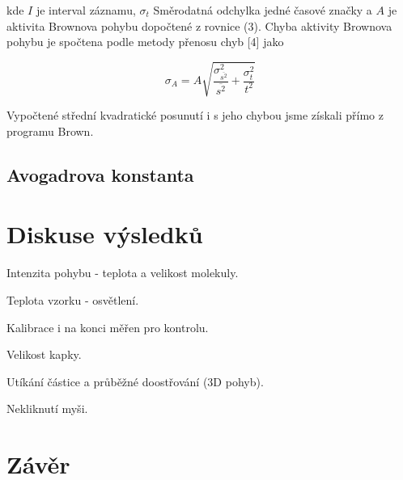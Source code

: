 kde $I$ je interval záznamu, \(\sigma_t\) Směrodatná odchylka jedné časové značky a $A$ je aktivita Brownova pohybu dopočtené z rovnice (3). Chyba aktivity Brownova pohybu je spočtena podle metody přenosu chyb [4] jako

\begin{equation}
    \sigma_A = A \sqrt{\frac{\sigma^2_{\overline{s^2}}}{\overline{s^2}} + \frac{\sigma^2_t}{t^2}}
\end{equation}

Vypočtené střední kvadratické posunutí i s jeho chybou jsme získali přímo z programu Brown.

\subsection{Avogadrova konstanta}


    
\section{Diskuse výsledků}

Intenzita pohybu - teplota a velikost molekuly.

Teplota vzorku - osvětlení.

Kalibrace i na konci měřen pro kontrolu.

Velikost kapky.

Utíkání částice a průběžné doostřování (3D pohyb).

Nekliknutí myši.

\section{Závěr}
